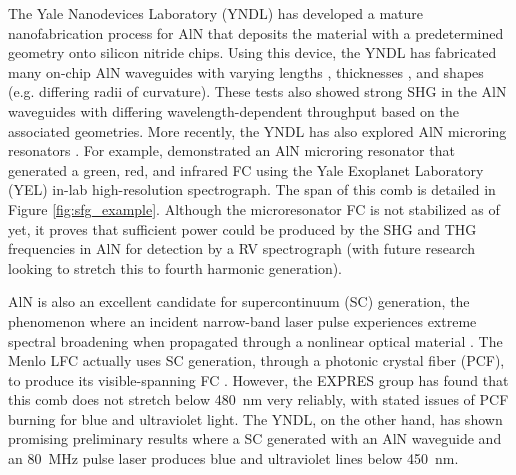 The Yale Nanodevices Laboratory (YNDL) has developed a mature nanofabrication process for AlN that deposits the material with a predetermined geometry onto silicon nitride chips. Using this device, the YNDL has fabricated many on-chip AlN waveguides with varying lengths \citep[\SI{300}{\micro\meter} to \SI{3}{\centi\meter};][]{Xiong2012a}, thicknesses \citep[330--\SI{1500}{\nano\meter};][]{Pernice2012}, and shapes (e.g. differing radii of curvature). These tests also showed strong SHG in the AlN waveguides with differing wavelength-dependent throughput based on the associated geometries. More recently, the YNDL has also explored AlN microring resonators \citep{Jung2013, Guo2016}. For example, \citet{Jung2014a} demonstrated an AlN microring resonator that generated a green, red, and infrared FC using the Yale Exoplanet Laboratory (YEL) in-lab high-resolution spectrograph. The span of this comb is detailed in Figure \ref{fig:sfg_example}. Although the microresonator FC is not stabilized as of yet, it proves that sufficient power could be produced by the SHG and THG frequencies in AlN for detection by a RV spectrograph (with future research looking to stretch this to fourth harmonic generation).



AlN is also an excellent candidate for supercontinuum (SC) generation, the phenomenon where an incident narrow-band laser pulse experiences extreme spectral broadening when propagated through a nonlinear optical material \citep{Dudley2006}. The Menlo LFC actually uses SC generation, through a photonic crystal fiber (PCF), to produce its visible-spanning FC \citep{Probst2014}. However, the EXPRES group has found that this comb does not stretch below \SI{480}{\nano\meter} very reliably, with stated issues of PCF burning for blue and ultraviolet light. The YNDL, on the other hand, has shown promising preliminary results where a SC generated with an AlN waveguide and an \SI{80}{\mega\hertz} pulse laser produces blue and ultraviolet lines below \SI{450}{\nano\meter}. 



